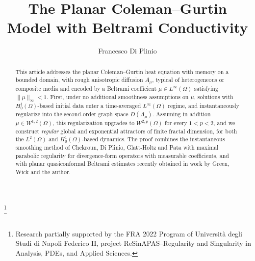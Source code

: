 \documentclass[12pt,leqno]{amsart}
\theoremstyle{definition}
\numberwithin{equation}{section}
\numberwithin{figure}{section}
\begin{document}
 
\title[Coleman--Gurtin with Beltrami conductivity]{The Planar Coleman--Gurtin Model with Beltrami Conductivity}  

	
	\author[F.  Di Plinio]{Francesco Di Plinio} 
\address[F.  Di Plinio]{Dipartimento di Matematica e Applicazioni ``R.  Caccioppoli'' \  \newline\indent Universit\`a di Napoli ``Federico II'', Via Cintia, Monte S.  Angelo 80126 Napoli, Italy}
\thanks{Research  partially supported by the FRA 2022 Program of Universit\`a degli Studi di  Napoli Federico II, project ReSinAPAS--Regularity and Singularity in Analysis, PDEs, and Applied Sciences.}
  
 




\begin{abstract}
This article addresses the planar Coleman--Gurtin heat equation with memory on a bounded domain, with rough
anisotropic diffusion $A_\mu$, typical of heterogeneous or composite media and  encoded by a Beltrami coefficient $\mu\in L^\infty(\Omega)$ satisfying  $\|\mu\|_{\infty}<1$.
 First, under no additional smoothness assumptions on $\mu$, solutions with $H^1_0(\Omega)$-based initial data enter a time-averaged $L^\infty(\Omega)$   regime, and instantaneously regularize into the second-order graph space $D(A_\mu)$. 
 Assuming in addition $\mu\in W^{1,2}(\Omega)$, this regularization upgrades to $W^{2,p}(\Omega)$ for every $1<p<2$, and we construct
\emph{regular} global and exponential attractors of  finite fractal dimension, for both the $L^2(\Omega)$ and $H^1_0(\Omega)$-based dynamics. The proof combines the instantaneous smoothing method of Chekroun, Di Plinio, Glatt-Holtz and Pata with   maximal parabolic regularity for divergence-form operators with measurable coefficients, and with  planar quasiconformal Beltrami estimates recently obtained in work by Green, Wick and the author.

\end{abstract}

 
 
	\maketitle
	
\end{document}

